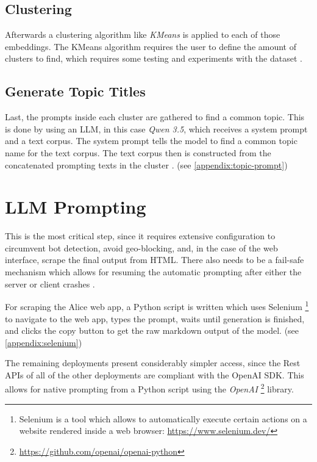 \subsection{Clustering}

Afterwards a clustering algorithm like \textit{KMeans} is applied to each of those embeddings. The KMeans algorithm requires the user to define the amount of clusters to find, which requires some testing and experiments with the dataset \cite{grootendorstBERTopicNeuralTopic2022a, sinagaUnsupervisedKMeansClustering2020}.

\subsection{Generate Topic Titles}

Last, the prompts inside each cluster are gathered to find a common topic. This is done by using an LLM, in this case \textit{Qwen 3.5}, which receives a system prompt and a text corpus. The system prompt tells the model to find a common topic name for the text corpus. The text corpus then is constructed from the concatenated prompting texts in the cluster \cite{theocharopoulosLargeLanguageModels2025,grootendorstBERTopicNeuralTopic2022a}. (see \ref{appendix:topic-prompt})

\section{LLM Prompting}

This is the most critical step, since it requires extensive configuration to circumvent bot detection, avoid geo-blocking, and, in the case of the web interface, scrape the final output from HTML. There also needs to be a fail-safe mechanism which allows for resuming the automatic prompting after either the server or client crashes \autocite{wahedAutomatingWebData2024}.

For scraping the Alice web app, a Python script is written which uses Selenium \footnote{Selenium is a tool which allows to automatically execute certain actions on a website rendered inside a web browser: \url{https://www.selenium.dev/}} to navigate to the web app, types the prompt, waits until generation is finished, and clicks the copy button to get the raw markdown output of the model. (see \ref{appendix:selenium})

The remaining deployments present considerably simpler access, since the Rest APIs of all of the other deployments are compliant with the OpenAI SDK. This allows for native prompting from a Python script using the \textit{OpenAI} \footnote{\url{https://github.com/openai/openai-python}} library.

